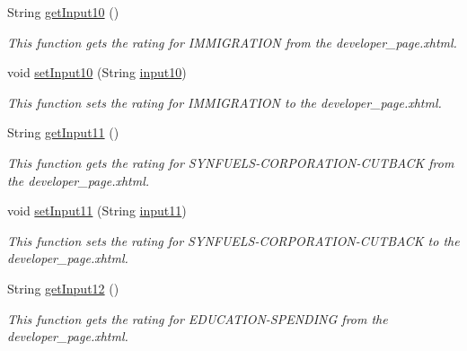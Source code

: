 \begin{DoxyCompactItemize}
String \hyperlink{classorg_1_1jboss_1_1as_1_1quickstarts_1_1greeter_1_1web_1_1_general_controller_a75a26a236120fae207833e70dcd6a8f1}{get\+Input10} ()
\begin{DoxyCompactList}\small\item\em This function gets the rating for I\+M\+M\+I\+G\+R\+A\+T\+I\+ON from the developer\+\_\+page.\+xhtml. \end{DoxyCompactList}\item 
void \hyperlink{classorg_1_1jboss_1_1as_1_1quickstarts_1_1greeter_1_1web_1_1_general_controller_aab82716ebf6ead1d9a9a349350e5bdc5}{set\+Input10} (String \hyperlink{classorg_1_1jboss_1_1as_1_1quickstarts_1_1greeter_1_1web_1_1_general_controller_aedc301e55f5bcbed0b3687d5ff8ec668}{input10})
\begin{DoxyCompactList}\small\item\em This function sets the rating for I\+M\+M\+I\+G\+R\+A\+T\+I\+ON to the developer\+\_\+page.\+xhtml. \end{DoxyCompactList}\item 
String \hyperlink{classorg_1_1jboss_1_1as_1_1quickstarts_1_1greeter_1_1web_1_1_general_controller_aafb5d80b765ec1ab71f303b359789a61}{get\+Input11} ()
\begin{DoxyCompactList}\small\item\em This function gets the rating for S\+Y\+N\+F\+U\+E\+L\+S-\/\+C\+O\+R\+P\+O\+R\+A\+T\+I\+O\+N-\/\+C\+U\+T\+B\+A\+CK from the developer\+\_\+page.\+xhtml. \end{DoxyCompactList}\item 
void \hyperlink{classorg_1_1jboss_1_1as_1_1quickstarts_1_1greeter_1_1web_1_1_general_controller_ae411202f9a59b5d4bf922d410bc717b5}{set\+Input11} (String \hyperlink{classorg_1_1jboss_1_1as_1_1quickstarts_1_1greeter_1_1web_1_1_general_controller_a5c3c597a8171ec9e2fd8afe7c2a958cd}{input11})
\begin{DoxyCompactList}\small\item\em This function sets the rating for S\+Y\+N\+F\+U\+E\+L\+S-\/\+C\+O\+R\+P\+O\+R\+A\+T\+I\+O\+N-\/\+C\+U\+T\+B\+A\+CK to the developer\+\_\+page.\+xhtml. \end{DoxyCompactList}\item 
String \hyperlink{classorg_1_1jboss_1_1as_1_1quickstarts_1_1greeter_1_1web_1_1_general_controller_a472a7d6dadb7371e32bf945e84f3d12a}{get\+Input12} ()
\begin{DoxyCompactList}\small\item\em This function gets the rating for E\+D\+U\+C\+A\+T\+I\+O\+N-\/\+S\+P\+E\+N\+D\+I\+NG from the developer\+\_\+page.\+xhtml. \end{DoxyCompactList}\item 

\end{DoxyCompactItemize}
